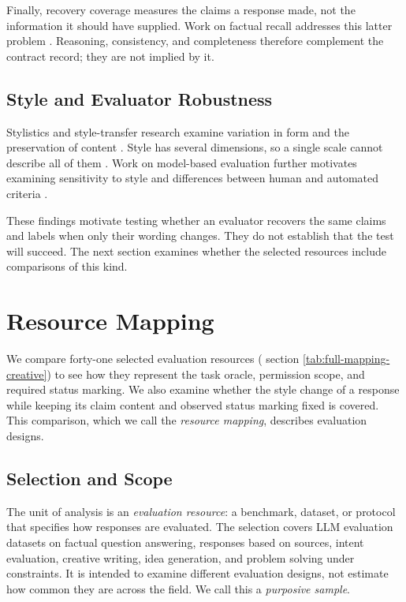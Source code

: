 \documentclass{clv2025}
\begin{document}
Finally, recovery coverage measures the claims a response made, not the
information it should have supplied. Work on factual recall addresses this
latter problem \citep{liu_verifact_2025,jafari_recall_2026}.
Reasoning, consistency, and completeness therefore complement the contract
record; they are not implied by it.

\subsection{Style and Evaluator Robustness}

Stylistics and style-transfer research examine variation in form and the
preservation of content
\citep{leech_short_style_1981,vanpeer_stylistics_2020,rao_dear_2018,briakou_evaluating_2021}.
Style has several dimensions, so a single scale cannot describe all of them
\citep{kang_style_2021,jin_deep_2022}.
Work on model-based evaluation further motivates examining sensitivity to
style and differences between human and automated criteria
\citep{feuer_style_2025,lyu_converge_2026}.

These findings motivate testing whether an evaluator recovers the same
claims and labels when only their wording changes. They do not establish
that the test will succeed. The next section examines whether the selected
resources include comparisons of this kind.

\section{Resource Mapping}\label{sec:methodology}

We compare forty-one selected evaluation resources ( section \ref{tab:full-mapping-creative}) to see how they represent
the task oracle, permission scope, and required status marking. We also
examine whether the style change of a response while keeping its claim
content and observed status marking fixed is covered. This comparison, which we call
the \emph{resource mapping}, describes evaluation designs. %

\subsection{Selection and Scope}

The unit of analysis is an \emph{evaluation resource}: a benchmark, dataset,
or protocol that specifies how responses are evaluated. The selection covers LLM evaluation datasets on 
factual question answering, responses based on sources, intent evaluation,
creative writing, idea generation, and problem solving under constraints.
It is intended to examine different evaluation designs, not estimate how
common they are across the field. We call this a \emph{purposive sample}.
\end{document}
